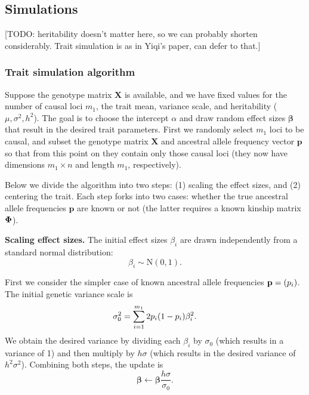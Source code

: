 \documentclass[11pt]{article}
\newcommand{\kinMat}{%
  \ensuremath{%
    \mathbf{\Phi}
  }%
  \xspace%
}%
\begin{document}
\subsection{Simulations}

[TODO: heritability doesn't matter here, so we can probably shorten considerably.
Trait simulation is as in Yiqi's paper, can defer to that.]

\subsubsection{Trait simulation algorithm}

Suppose the genotype matrix $\mathbf{X}$ is available, and we have fixed values for the number of causal loci $m_1$, the trait mean, variance scale, and heritability ($\mu, \sigma^2, h^2$).
The goal is to choose the intercept $\alpha$ and draw random effect sizes $\boldsymbol{\beta}$ that result in the desired trait parameters.
First we randomly select $m_1$ loci to be causal, and subset the genotype matrix $\mathbf{X}$ and ancestral allele frequency vector $\mathbf{p}$ so that from this point on they contain only those causal loci (they now have dimensions $m_1 \times n$ and length $m_1$, respectively).

Below we divide the algorithm into two steps: (1) scaling the effect sizes, and (2) centering the trait.
Each step forks into two cases: whether the true ancestral allele frequencies $\mathbf{p}$ are known or not (the latter requires a known kinship matrix $\kinMat$).

\textbf{Scaling effect sizes.}
The initial effect sizes $\beta_i$ are drawn independently from a standard normal distribution:
$$
\beta_i \sim \text{N}(0, 1).
$$

First we consider the simpler case of known ancestral allele frequencies $\mathbf{p} = ( p_i  )$.
The initial genetic variance scale is
$$
\sigma^2_0
=
\sum_{i=1}^{m_1} 2  p_i   (1- p_i  ) \beta_i^2
.
$$
We obtain the desired variance by dividing each $\beta_i$ by $\sigma_0$ (which results in a variance of 1) and then multiply by $h \sigma$ (which results in the desired variance of $h^2 \sigma^2$).
Combining both steps, the update is
$$
\boldsymbol{\beta}
\leftarrow
\boldsymbol{\beta} \frac{ h \sigma }{\sigma_0}
.
$$
\end{document}
